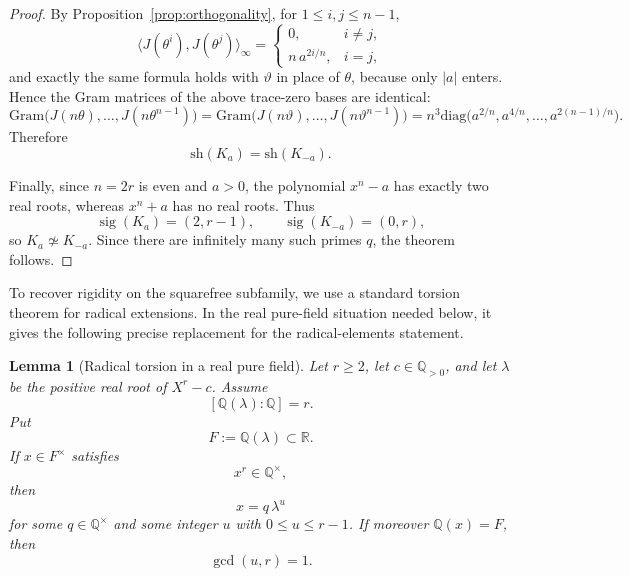 \documentclass[11pt,letterpaper]{amsart}
\newcommand{\Q}{\mathbb{Q}}
\newcommand{\R}{\mathbb{R}}
\newcommand{\sh}{\mathrm{sh}}
\newcommand{\diag}{\mathrm{diag}}
\theoremstyle{plain}
\newtheorem{lemma}[theorem]{Lemma}
\theoremstyle{definition}
\begin{document}
\begin{proof}
By Proposition~\ref{prop:orthogonality}, for \(1\le i,j\le n-1\),
\[
\bigl\langle J(\theta^i),J(\theta^j)\bigr\rangle_\infty
=
\begin{cases}
0,& i\neq j,\\[2mm]
n\,a^{2i/n},& i=j,
\end{cases}
\]
and exactly the same formula holds with \(\vartheta\) in place of \(\theta\), because only \(|a|\)
enters. Hence the Gram matrices of the above trace-zero bases are identical:
\[
\mathrm{Gram}\bigl(J(n\theta),\dots,J(n\theta^{n-1})\bigr)
=
\mathrm{Gram}\bigl(J(n\vartheta),\dots,J(n\vartheta^{n-1})\bigr)
=
n^3\diag\!\bigl(a^{2/n},a^{4/n},\dots,a^{2(n-1)/n}\bigr).
\]
Therefore
\[
\sh(K_a)=\sh(K_{-a}).
\]

Finally, since \(n=2r\) is even and \(a>0\), the polynomial \(x^n-a\) has exactly two real roots,
whereas \(x^n+a\) has no real roots. Thus
\[
\operatorname{sig}(K_a)=(2,r-1),
\qquad
\operatorname{sig}(K_{-a})=(0,r),
\]
so \(K_a\not\simeq K_{-a}\).
Since there are infinitely many such primes \(q\), the theorem follows.
\end{proof}

To recover rigidity on the squarefree subfamily, we use a standard torsion
theorem for radical extensions.  In the real pure-field situation needed below,
it gives the following precise replacement for the radical-elements statement.

\begin{lemma}[Radical torsion in a real pure field]
\label{lem:pure-generators}
Let \(r\ge 2\), let \(c\in \Q_{>0}\), and let \(\lambda\) be the positive real
root of \(X^r-c\).  Assume
\[
[\Q(\lambda):\Q]=r.
\]
Put
\[
F:=\Q(\lambda)\subset \R.
\]
If \(x\in F^\times\) satisfies
\[
x^r\in \Q^\times,
\]
then
\[
x=q\,\lambda^u
\]
for some \(q\in \Q^\times\) and some integer \(u\) with \(0\le u\le r-1\).
If moreover \(\Q(x)=F\), then
\[
\gcd(u,r)=1.
\]
\end{lemma}
\end{document}
